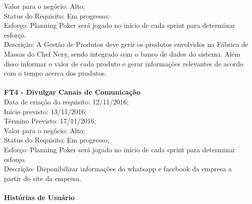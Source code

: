 \begin{apendicesenv}
\tab Valor para o negócio: Alto;\\
\tab Status do Requisito: Em progresso;\\
\tab Esforço: Planning Poker será jogado no início de cada sprint para determinar esforço.\\
\tab Descrição:  A Gestão de Produtos deve gerir os produtos envolvidos na Fábrica de Massas do Chef Nery, sendo integrado com o banco de dados do sistema. Além disso informar o valor de cada produto e gerar informações relevantes de acordo com o tempo acerca dos produtos.\\
\\
\textbf{FT4 - Divulgar Canais de Comunicação }\\
\tab Data de criação do requisito: 12/11/2016;\\
\tab Início previsto: 13/11/2016;\\
\tab Término Previsto: 17/11/2016;\\
\tab Valor para o negócio: Alto;\\
\tab Status do Requisito: Em progresso;\\
\tab Esforço: Planning Poker será jogado no início de cada sprint para determinar esforço.\\
\tab Descrição: Disponibilizar informações do whatsapp e facebook da empresa a partir do site da empresa.\\
\\

\textbf{Histórias de Usuário}\\



\end{apendicesenv}
